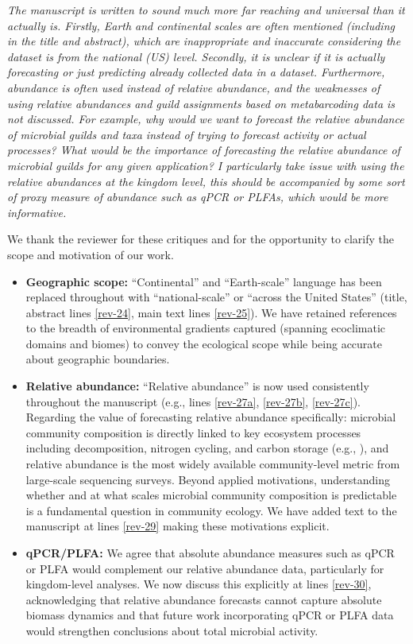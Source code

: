 \documentclass[11pt]{article}
\begin{document}
\textit{The manuscript is written to sound much more far reaching and universal than it actually is. Firstly, Earth and continental scales are often mentioned (including in the title and abstract), which are inappropriate and inaccurate considering the dataset is from the national (US) level. Secondly, it is unclear if it is actually forecasting or just predicting already collected data in a dataset. Furthermore, abundance is often used instead of relative abundance, and the weaknesses of using relative abundances and guild assignments based on metabarcoding data is not discussed. For example, why would we want to forecast the relative abundance of microbial guilds and taxa instead of trying to forecast activity or actual processes? What would be the importance of forecasting the relative abundance of microbial guilds for any given application? I particularly take issue with using the relative abundances at the kingdom level, this should be accompanied by some sort of proxy measure of abundance such as qPCR or PLFAs, which would be more informative.}

We thank the reviewer for these critiques and for the opportunity to clarify the scope and motivation of our work.

\begin{itemize}
\item \textbf{Geographic scope:} ``Continental'' and ``Earth-scale'' language has been replaced throughout with ``national-scale'' or ``across the United States'' (title, abstract lines \ref{rev-24}, main text lines \ref{rev-25}). We have retained references to the breadth of environmental gradients captured (spanning %
 ecoclimatic domains and %
 biomes) to convey the ecological scope while being accurate about geographic boundaries.

\item \textbf{Relative abundance:} ``Relative abundance'' is now used consistently throughout the manuscript (e.g., lines \ref{rev-27a}, \ref{rev-27b}, \ref{rev-27c}). Regarding the value of forecasting relative abundance specifically: microbial community composition is directly linked to key ecosystem processes including decomposition, nitrogen cycling, and carbon storage (e.g., %
), and relative abundance is the most widely available community-level metric from large-scale sequencing surveys. Beyond applied motivations, understanding whether and at what scales microbial community composition is predictable is a fundamental question in community ecology. We have added text to the manuscript at lines \ref{rev-29} making these motivations explicit.

\item \textbf{qPCR/PLFA:} We agree that absolute abundance measures such as qPCR or PLFA would complement our relative abundance data, particularly for kingdom-level analyses. We now discuss this explicitly at lines \ref{rev-30}, acknowledging that relative abundance forecasts cannot capture absolute biomass dynamics and that future work incorporating qPCR or PLFA data would strengthen conclusions about total microbial activity.
\end{itemize}
\end{document}
